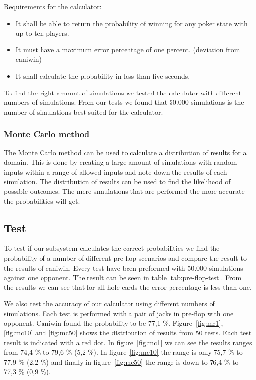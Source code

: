 Requirements for the calculator:
\begin{itemize}
\item It shall be able to return the probability of winning for any poker state with up to ten players.
\item It must have a maximum error percentage of one percent. (deviation from caniwin)
\item It shall calculate the probability in less than five seconds.
\end{itemize}

To find the right amount of simulations we tested the calculator with different numbers of simulations. From our tests we found that 50.000 simulations is the number of simulations best suited for the calculator.

\subsubsection{Monte Carlo method}
The Monte Carlo method can be used to calculate a distribution of results for a domain. This is done by creating a large amount of simulations with random inputs within a range of allowed inputs and note down the results of each simulation. The distribution of results can be used to find the likelihood of possible outcomes. The more simulations that are performed the more accurate the probabilities will get.

\subsection{Test}
To test if our subsystem calculates the correct probabilities we find the probability of a number of different pre-flop scenarios and compare the result to the results of caniwin. Every test have been preformed with 50.000 simulations against one opponent. The result can be seen in table \ref{tab:pre-flop-test}. From the results we can see that for all hole cards the error percentage is less than one.

We also test the accuracy of our calculator using different numbers of simulations. Each test is performed with a pair of jacks in pre-flop with one opponent. Caniwin found the probability to be 77,1 \%. Figure~\ref{fig:mc1}, \ref{fig:mc10} and \ref{fig:mc50} shows the distribution of results from 50 tests. Each test result is indicated with a red dot. In figure~\ref{fig:mc1} we can see the results ranges from 74,4 \% to 79,6 \% (5,2 \%). In figure~\ref{fig:mc10} the range is only 75,7 \% to 77,9 \% (2,2 \%) and finally in figure~\ref{fig:mc50} the range is down to 76,4 \% to 77,3 \% (0,9 \%).

